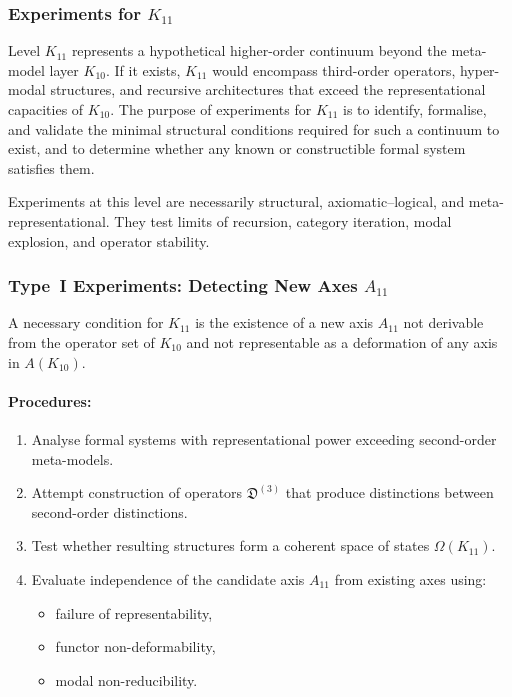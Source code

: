 
\subsubsection{Experiments for $K_{11}$}
\label{sec:experiments-k11}

Level $K_{11}$ represents a hypothetical higher-order continuum
beyond the meta-model layer $K_{10}$.
If it exists, $K_{11}$ would encompass third-order operators,
hyper-modal structures, and recursive architectures that exceed the
representational capacities of $K_{10}$.
The purpose of experiments for $K_{11}$ is to identify, formalise,
and validate the minimal structural conditions required for such a
continuum to exist, and to determine whether any known or constructible
formal system satisfies them.

Experiments at this level are necessarily structural,
axiomatic–logical, and meta-representational.
They test limits of recursion, category iteration, modal explosion,
and operator stability.



\subsubsection{Type~I Experiments: Detecting New Axes $A_{11}$}

A necessary condition for $K_{11}$ is the existence of a new axis
$A_{11}$ not derivable from the operator set of $K_{10}$ and not
representable as a deformation of any axis in $A(K_{10})$.

\paragraph{Procedures:}

\begin{enumerate}
    \item Analyse formal systems with representational power exceeding
          second-order meta-models.
    \item Attempt construction of operators $\mathfrak{D}^{(3)}$
          that produce distinctions between second-order distinctions.
    \item Test whether resulting structures form a coherent space
          of states $\Omega(K_{11})$.
    \item Evaluate independence of the candidate axis $A_{11}$ from
          existing axes using:
          \begin{itemize}
              \item failure of representability,
              \item functor non-deformability,
              \item modal non-reducibility.
          \end{itemize}
\end{enumerate}

